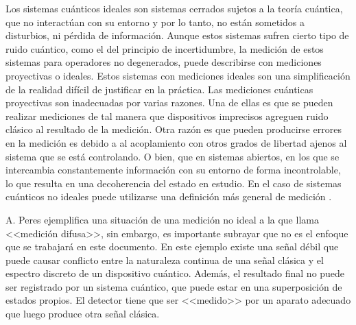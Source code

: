 Los sistemas cuánticos ideales son sistemas cerrados sujetos a la teoría cuántica, que no interactúan con su entorno y por lo tanto, no están sometidos a disturbios, ni pérdida de información. Aunque estos sistemas sufren cierto tipo de ruido cuántico, como el del principio de incertidumbre, la medición de estos sistemas para operadores no degenerados, puede describirse con mediciones proyectivas o ideales. Estos sistemas con mediciones ideales son una simplificación de la realidad difícil de justificar en la práctica. Las mediciones cuánticas proyectivas son inadecuadas por varias razones. Una de ellas es que se pueden realizar mediciones de tal manera que dispositivos imprecisos agreguen ruido clásico al resultado de la medición. Otra razón es que pueden producirse errores en la medición es debido a al acoplamiento con otros grados de libertad ajenos al sistema que se está controlando. O bien, que en sistemas abiertos, en los que se intercambia constantemente información con su entorno de forma incontrolable, lo que resulta en una decoherencia del estado en estudio. En el caso de sistemas cuánticos no ideales puede utilizarse una definición más general de medición {\cite{wilde2011classical, jaeger2007quantum}}.




A. Peres {\cite{peres1997quantum}} ejemplifica una situación de una medición no ideal a la que llama <<medición difusa>>, sin embargo, es importante subrayar que no es el enfoque que se trabajará en este documento. En este ejemplo existe una señal débil que puede causar conflicto entre la naturaleza continua de una señal clásica y el espectro discreto de un dispositivo cuántico. Además, el resultado final no puede ser registrado por un sistema cuántico, que puede estar en una superposición de estados propios. El detector tiene que ser <<medido>> por un aparato adecuado que luego produce otra señal clásica.


